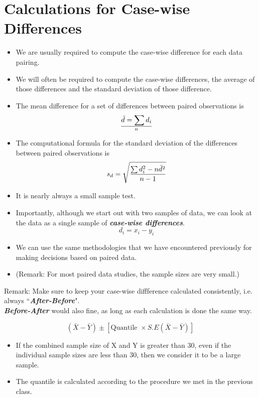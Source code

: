 \documentclass[]{report}
\begin{document}
\section{Calculations for Case-wise Differences}
\begin{itemize}
\item We are usually required to compute the case-wise difference for each data pairing.

\item We will often be required to compute the case-wise differences, the average of those differences and the standard deviation of those difference.



\item The mean difference for a set of differences between paired observations is
\[ \bar{d} = \sum d_i \over n \]

\item The computational formula for the standard deviation of the differences
between paired observations is
\[s_d = \sqrt{ {\sum d_i^2 - n\bar{d}^2 \over n-1}}\]
\item It is nearly always a small sample test.



\item Importantly, although we start out with two samples of data, we can look at the data as a single sample of \textit{\textbf{case-wise differences}}.
\[d_i = x_i-y_i\]
\item We can use the same methodologies that we have encountered previously for making decisions based on paired data.
\item (Remark: For most paired data studies, the sample sizes are very small.)

\end{itemize}

\noindent Remark: Make sure to keep your case-wise diffference calculated consistently, i.e. always ``\textbf{\textit{After-Before}}". \\
\textbf{\textit{Before-After}} would also fine, as long as each calculation is done the same way.








\[ ( \bar{X} - \bar{Y} ) \pm \left[ \mbox{Quantile } \times S.E(\bar{X}-\bar{Y}) \right] \]
\begin{itemize}
\item If the combined sample size of X and Y is greater than 30, even if the individual sample sizes are less than 30, then we consider it to be a large sample.
\item The quantile is calculated according to the procedure we met in the previous class.
\end{itemize}
\end{document}
